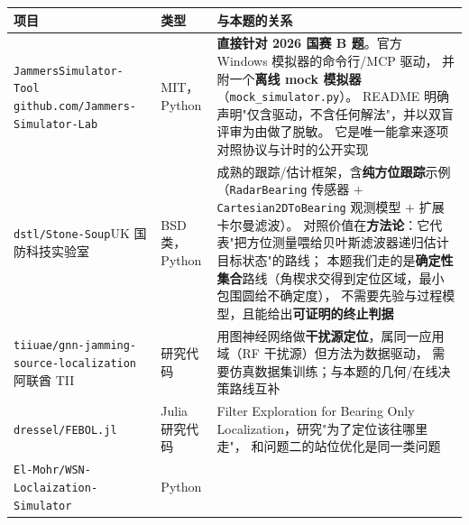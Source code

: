 \begin{longtable}{p{3.9cm}p{1.9cm}p{9.0cm}}
\toprule
项目 & 类型 & 与本题的关系 \\ \midrule
\endhead
\texttt{JammersSimulator\hspace{0pt}-\hspace{0pt}Tool}\newline
\scriptsize \texttt{github.com/\hspace{0pt}Jammers\hspace{0pt}-\hspace{0pt}Simulator\hspace{0pt}-\hspace{0pt}Lab} &
MIT，Python & \textbf{直接针对 2026 国赛 B 题}。官方 Windows 模拟器的命令行/MCP 驱动，
并附一个\textbf{离线 mock 模拟器}（\texttt{mock\_simulator.py}）。
README 明确声明"仅含驱动，不含任何解法"，并以双盲评审为由做了脱敏。
它是唯一能拿来逐项对照协议与计时的公开实现 \\
\texttt{dstl/\hspace{0pt}Stone\hspace{0pt}-\hspace{0pt}Soup}\newline \scriptsize UK 国防科技实验室 &
BSD 类，Python & 成熟的跟踪/估计框架，含\textbf{纯方位跟踪}示例
（\texttt{RadarBearing} 传感器 $+$ \texttt{Cartesian2DToBearing} 观测模型 $+$ 扩展卡尔曼滤波）。
对照价值在\textbf{方法论}：它代表"把方位测量喂给贝叶斯滤波器递归估计目标状态"的路线；
本题我们走的是\textbf{确定性集合}路线（角楔求交得到定位区域，最小包围圆给不确定度），
不需要先验与过程模型，且能给出\textbf{可证明的终止判据} \\
\texttt{tiiuae/\hspace{0pt}gnn\hspace{0pt}-\hspace{0pt}jamming\hspace{0pt}-\hspace{0pt}source\hspace{0pt}-\hspace{0pt}localization}\newline
\scriptsize 阿联酋 TII &
研究代码 & 用图神经网络做\textbf{干扰源定位}，属同一应用域（RF 干扰源）但方法为数据驱动，
需要仿真数据集训练；与本题的几何/在线决策路线互补 \\
\texttt{dressel/\hspace{0pt}FEBOL.jl} & Julia 研究代码 &
Filter Exploration for Bearing Only Localization，研究"为了定位该往哪里走"，
和问题二的站位优化是同一类问题 \\
\texttt{El\hspace{0pt}-\hspace{0pt}Mohr/\hspace{0pt}WSN\hspace{0pt}-\hspace{0pt}Loclaization\hspace{0pt}-\hspace{0pt}Simulator} & Python &

\end{longtable}
